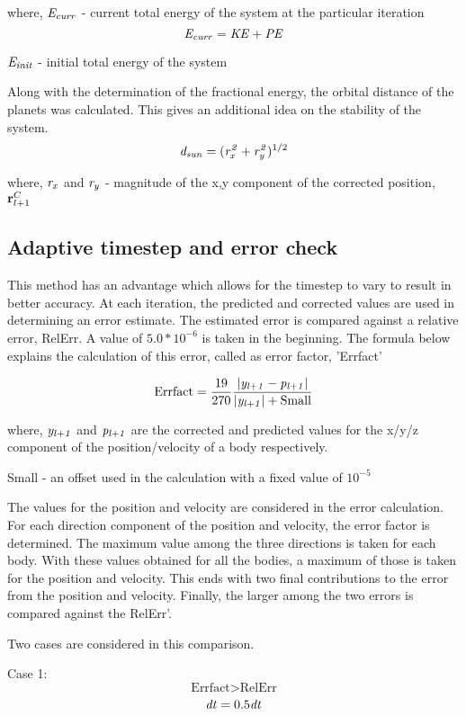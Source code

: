 \documentclass{article}
\begin{document}
{{where,
$\it E_{curr}$ - current total energy of the system at the particular iteration
\[ {\it E_{curr}} = {\it KE} + {\it PE} \]

$\it E_{init}$ - initial total energy of the system
\smallskip

Along with the determination of the fractional energy, the orbital distance of the planets was calculated. This gives an additional idea on the stability of the system. 
\[ {\it d_{sun}} = ({\it r_x^2} + {\it r_y^2})^{1/2} \]

where,
${\it r_x}$ and ${\it r_y}$ -  magnitude of the x,y component of the corrected position, ${{\bf r}_{l+1}^C}$
}
\subsection{Adaptive timestep and error check}
{\normalsize{

This method has an advantage which allows for the timestep to vary to result in better accuracy. At each iteration, the predicted and corrected values are used in determining an error estimate. The estimated error is compared against a relative error, RelErr. A value of $5.0 * 10^{-6}$ is taken in the beginning. The formula below explains the calculation of this error, called as error factor, 'Errfact'

\[ \textrm{Errfact} = \frac{19}{270} \frac{\left| {\it y_{l+1}} - {\it p_{l+1}} \right|} {{\left| {\it y_{l+1}} \right|} + \textrm{Small}} \]
\smallskip

where,
${\it y_{l+1}}$ and ${\it p_{l+1}}$ are the corrected and predicted values for the x/y/z component of the position/velocity of a body respectively. 

Small - an offset used in the calculation with a fixed value of $10^{-5}$ 

The values for the position and velocity are considered in the error calculation. For each direction component of the position and velocity, the error factor is determined. The maximum value among the three directions is taken for each body. With these values obtained for all the bodies, a maximum of those is taken for the position and velocity. This ends with two final contributions to the error from the position and velocity.  Finally, the larger among the two errors is compared against the RelErr'. 

Two cases are considered in this comparison.
\smallskip

Case 1:  \[\textrm{Errfact} > \textrm{RelErr} \]   \[{\it dt} = 0.5{\it dt} \]

}}}
\end{document}
